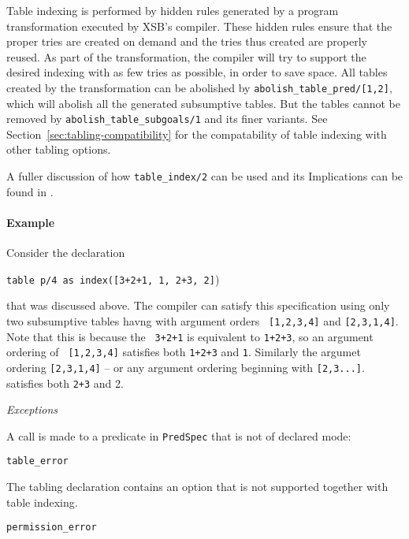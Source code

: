 \begin{description}
\begin{description}
Table indexing is performed by hidden rules generated by a program
transformation executed by XSB's compiler.  These hidden rules ensure
that the proper tries are created on demand and the tries thus created
are properly reused.  As part of the transformation, the compiler will
try to support the desired indexing with as few tries as possible, in
order to save space.  All tables created by the transformation can be
abolished by {\tt abolish\_table\_pred/[1,2]}, which will abolish all
the generated subsumptive tables.  But the tables cannot be removed by
{\tt abolish\_table\_subgoals/1} and its finer variants.  See
Section~\ref{sec:tabling-compatibility} for the compatability of table
indexing with other tabling options.

A fuller discussion of how {\tt table\_index/2} can be used and its
Implications can be found in \cite{warren-tdbu}.

\paragraph*{Example}
Consider the declaration

{\tt table p/4 as index([3+2+1, 1, 2+3, 2]})

that was discussed above.  The compiler can satisfy this specification
using only two subsumptive tables havng with argument orders {\tt
  [1,2,3,4]} and {\tt [2,3,1,4]}.  Note that this is because the {\tt
  3+2+1} is equivalent to {\tt 1+2+3}, so an argument ordering of {\tt
  [1,2,3,4]} satisfies both {\tt 1+2+3} and {\tt 1}.  Similarly the
argumet ordering {\tt [2,3,1,4]} -- or any argument ordering beginning
with {\tt [2,3...]}. satisfies both {\tt 2+3} and {2}.

{\em Exceptions}
\bi
\item A call is made to a predicate in {\tt PredSpec} that is not of declared mode:
\bi
\item {\tt table\_error}
\ei
\item The tabling declaration contains an option that is not supported
  together with table indexing.
  \bi
  \item {\tt permission\_error}
  \ei
\ei



\end{description}
\end{description}

